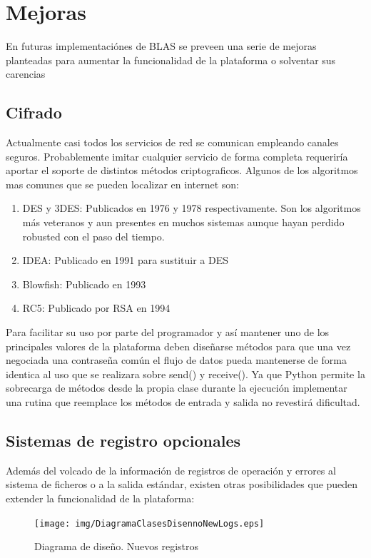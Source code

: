 \documentclass[a4paper,spanish,12pt]{book}
\begin{document}
\section{Mejoras}

En futuras implementaciónes de BLAS se preveen una serie de mejoras planteadas para aumentar la funcionalidad de la plataforma o solventar sus carencias

\subsection{Cifrado}
Actualmente casi todos los servicios de red se comunican empleando canales seguros. Probablemente imitar cualquier servicio de forma completa requeriría aportar el soporte de distintos m\'etodos criptograficos. Algunos de los algoritmos mas comunes que se pueden localizar en internet son:
\begin{enumerate}
	\item{DES y 3DES: Publicados en 1976 y 1978 respectivamente. Son los algoritmos más veteranos y aun presentes en muchos sistemas aunque hayan perdido robusted con el paso del tiempo.}
	\item{IDEA: Publicado en 1991 para sustituir a DES}
	\item{Blowfish: Publicado en 1993}
	\item{RC5: Publicado por RSA en 1994}
\end{enumerate}
Para facilitar su uso por parte del programador y así mantener uno de los principales valores de la plataforma deben diseñarse m\'etodos para que una vez negociada una contraseña común el flujo de datos pueda mantenerse de forma identica al uso que se realizara sobre send() y receive(). Ya que Python permite la sobrecarga de m\'etodos desde la propia clase durante la ejecución implementar una rutina que reemplace los m\'etodos de entrada y salida no revestirá dificultad.

\subsection{Sistemas de registro opcionales}
Además del volcado de la información de registros de operación y errores al sistema de ficheros o a la salida estándar, existen otras posibilidades que pueden extender la funcionalidad de la plataforma:
\begin{figure}[h] %
	\texttt{[image: img/DiagramaClasesDisennoNewLogs.eps]}	
              \caption{Diagrama de diseño. Nuevos registros}
  \label{fig:DiagramaClasesDisennoNewLog}
\end{figure}
\end{document}

